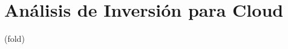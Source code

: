 \section{Análisis de Inversión para Cloud} %
\label{sec:Análisis de Inversión para Cloud}
 (fold)






















